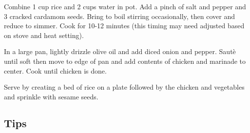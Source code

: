 \tab Combine 1 cup rice and 2 cups water in pot. Add a pinch of salt and pepper and 3 cracked cardamom seeds. Bring to boil stirring occasionally, then cover and reduce to simmer. Cook for 10-12 minutes (this timing may need adjusted based on stove and heat setting). 

\tab In a large pan, lightly drizzle olive oil and add diced onion and pepper. Saut\`{e} until soft then move to edge of pan and add contents of chicken and marinade to center. Cook until chicken is done. 

\tab Serve by creating a bed of rice on a plate followed by the chicken and vegetables and sprinkle with sesame seeds.

\subsection*{Tips}

	